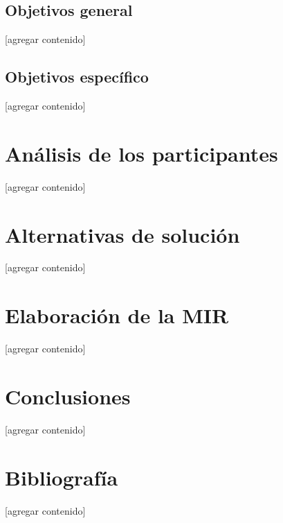 \documentclass{article}
\begin{document}
\subsection{Objetivos general}
[agregar contenido]

\subsection{Objetivos específico}
[agregar contenido]

\section{Análisis de los participantes}
[agregar contenido]

\section{Alternativas de solución}
[agregar contenido]

\section{Elaboración de la MIR}
[agregar contenido]

\section{Conclusiones}
[agregar contenido]

\section{Bibliografía}
[agregar contenido]
\end{document}
